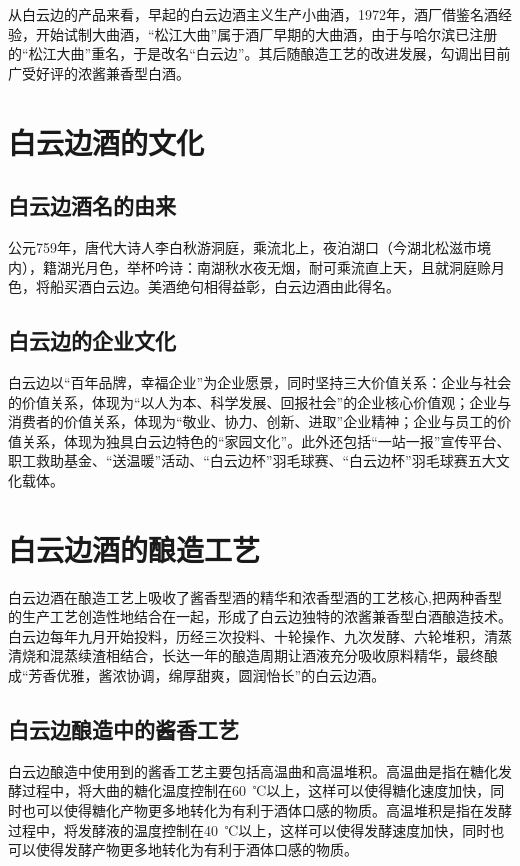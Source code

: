 \documentclass{ctexart}
\begin{document}
    从白云边的产品来看，早起的白云边酒主义生产小曲酒，1972年，酒厂借鉴名酒经验，开始试制大曲酒，“松江大曲”属于酒厂早期的大曲酒，由于与哈尔滨已注册的“松江大曲”重名，于是改名“白云边”。其后随酿造工艺的改进发展，勾调出目前广受好评的浓酱兼香型白酒。

    
    \section{白云边酒的文化}
    \subsection{白云边酒名的由来}
    公元759年，唐代大诗人李白秋游洞庭，乘流北上，夜泊湖口（今湖北松滋市境内），籍湖光月色，举杯吟诗：南湖秋水夜无烟，耐可乘流直上天，且就洞庭赊月色，将船买酒白云边。美酒绝句相得益彰，白云边酒由此得名。
    \subsection{白云边的企业文化}
    白云边以“百年品牌，幸福企业”为企业愿景，同时坚持三大价值关系：企业与社会的价值关系，体现为“以人为本、科学发展、回报社会”的企业核心价值观；企业与消费者的价值关系，体现为“敬业、协力、创新、进取”企业精神；企业与员工的价值关系，体现为独具白云边特色的“家园文化”。此外还包括“一站一报”宣传平台、职工救助基金、“送温暖”活动、“白云边杯”羽毛球赛、“白云边杯”羽毛球赛五大文化载体。

    \section{白云边酒的酿造工艺}
    白云边酒在酿造工艺上吸收了酱香型酒的精华和浓香型酒的工艺核心,把两种香型的生产工艺创造性地结合在一起，形成了白云边独特的浓酱兼香型白酒酿造技术。白云边每年九月开始投料，历经三次投料、十轮操作、九次发酵、六轮堆积，清蒸清烧和混蒸续渣相结合，长达一年的酿造周期让酒液充分吸收原料精华，最终酿成“芳香优雅，酱浓协调，绵厚甜爽，圆润怡长”的白云边酒。

    \subsection{白云边酿造中的酱香工艺}
    白云边酿造中使用到的酱香工艺主要包括高温曲和高温堆积。高温曲是指在糖化发酵过程中，将大曲的糖化温度控制在60~℃以上，这样可以使得糖化速度加快，同时也可以使得糖化产物更多地转化为有利于酒体口感的物质。高温堆积是指在发酵过程中，将发酵液的温度控制在40~℃以上，这样可以使得发酵速度加快，同时也可以使得发酵产物更多地转化为有利于酒体口感的物质。
\end{document}
